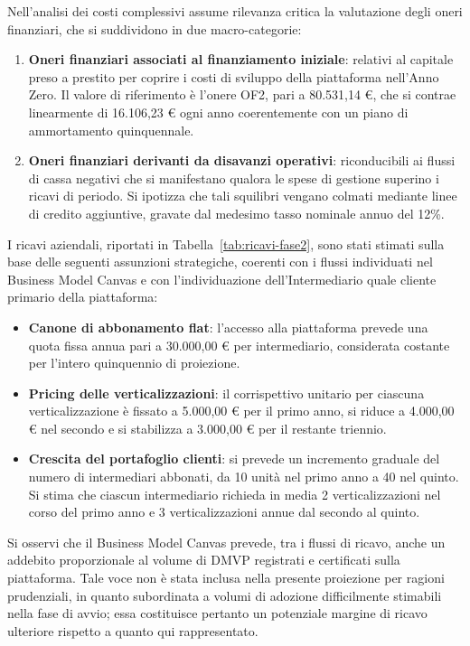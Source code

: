 Nell'analisi dei costi complessivi assume rilevanza critica la valutazione degli oneri finanziari, che si suddividono in due macro-categorie:

\begin{enumerate}
    \item \textbf{Oneri finanziari associati al finanziamento iniziale}: relativi al capitale preso a prestito per coprire i costi di sviluppo della piattaforma nell'Anno Zero. Il valore di riferimento \`e l'onere OF2, pari a 80.531,14 \euro{}, che si contrae linearmente di 16.106,23 \euro{} ogni anno coerentemente con un piano di ammortamento quinquennale.
    \item \textbf{Oneri finanziari derivanti da disavanzi operativi}: riconducibili ai flussi di cassa negativi che si manifestano qualora le spese di gestione superino i ricavi di periodo. Si ipotizza che tali squilibri vengano colmati mediante linee di credito aggiuntive, gravate dal medesimo tasso nominale annuo del 12\%.
\end{enumerate}

I ricavi aziendali, riportati in Tabella~\ref{tab:ricavi-fase2}, sono stati stimati sulla base delle seguenti assunzioni strategiche, coerenti con i flussi individuati nel Business Model Canvas e con l'individuazione dell'Intermediario quale cliente primario della piattaforma:

\begin{itemize}
    \item \textbf{Canone di abbonamento flat}: l'accesso alla piattaforma prevede una quota fissa annua pari a 30.000,00 \euro{} per intermediario, considerata costante per l'intero quinquennio di proiezione.
    \item \textbf{Pricing delle verticalizzazioni}: il corrispettivo unitario per ciascuna verticalizzazione \`e fissato a 5.000,00 \euro{} per il primo anno, si riduce a 4.000,00 \euro{} nel secondo e si stabilizza a 3.000,00 \euro{} per il restante triennio.
    \item \textbf{Crescita del portafoglio clienti}: si prevede un incremento graduale del numero di intermediari abbonati, da 10 unit\`a nel primo anno a 40 nel quinto. Si stima che ciascun intermediario richieda in media 2 verticalizzazioni nel corso del primo anno e 3 verticalizzazioni annue dal secondo al quinto.
\end{itemize}

Si osservi che il Business Model Canvas prevede, tra i flussi di ricavo, anche un addebito proporzionale al volume di DMVP registrati e certificati sulla piattaforma. Tale voce non \`e stata inclusa nella presente proiezione per ragioni prudenziali, in quanto subordinata a volumi di adozione difficilmente stimabili nella fase di avvio; essa costituisce pertanto un potenziale margine di ricavo ulteriore rispetto a quanto qui rappresentato.

